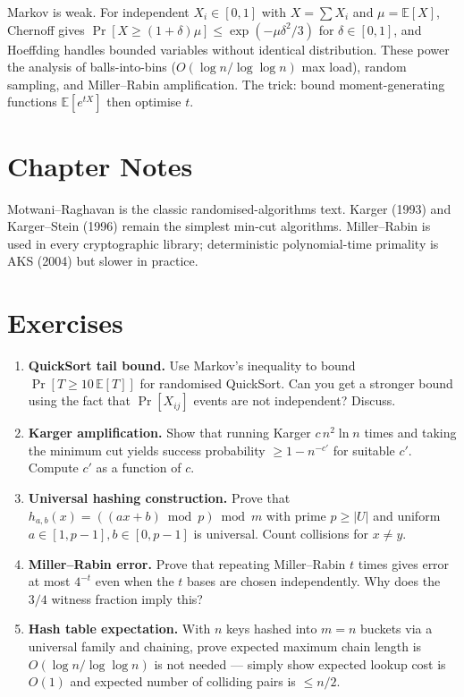Markov is weak. For independent $X_i\in[0,1]$ with $X=\sum X_i$ and $\mu=\mathbb{E}[X]$, Chernoff gives $\Pr[X\ge(1+\delta)\mu]\le\exp(-\mu\delta^2/3)$ for $\delta\in[0,1]$, and Hoeffding handles bounded variables without identical distribution. These power the analysis of balls-into-bins ($O(\log n/\log\log n)$ max load), random sampling, and Miller--Rabin amplification. The trick: bound moment-generating functions $\mathbb{E}[e^{tX}]$ then optimise $t$.

\section{Chapter Notes}
Motwani--Raghavan is the classic randomised-algorithms text. Karger (1993) and Karger--Stein (1996) remain the simplest min-cut algorithms. Miller--Rabin is used in every cryptographic library; deterministic polynomial-time primality is AKS (2004) but slower in practice.

\section{Exercises}
\label{sec:ch02-exercises}
\begin{enumerate}[label=E2.\arabic*, leftmargin=*, itemsep=0.7em]
    \item \textbf{QuickSort tail bound.} Use Markov's inequality to bound $\Pr[T\ge 10\,\mathbb{E}[T]]$ for randomised QuickSort. Can you get a stronger bound using the fact that $\Pr[X_{ij}]$ events are not independent? Discuss.
    \item \textbf{Karger amplification.} Show that running Karger $c\,n^2\ln n$ times and taking the minimum cut yields success probability $\ge1-n^{-c'}$ for suitable $c'$. Compute $c'$ as a function of $c$.
    \item \textbf{Universal hashing construction.} Prove that $h_{a,b}(x)=((ax+b)\bmod p)\bmod m$ with prime $p\ge|U|$ and uniform $a\in[1,p-1],b\in[0,p-1]$ is universal. Count collisions for $x\neq y$.
    \item \textbf{Miller--Rabin error.} Prove that repeating Miller--Rabin $t$ times gives error at most $4^{-t}$ even when the $t$ bases are chosen independently. Why does the $3/4$ witness fraction imply this?
    \item \textbf{Hash table expectation.} With $n$ keys hashed into $m=n$ buckets via a universal family and chaining, prove expected maximum chain length is $O(\log n/\log\log n)$ is not needed --- simply show expected lookup cost is $O(1)$ and expected number of colliding pairs is $\le n/2$.
\end{enumerate}
